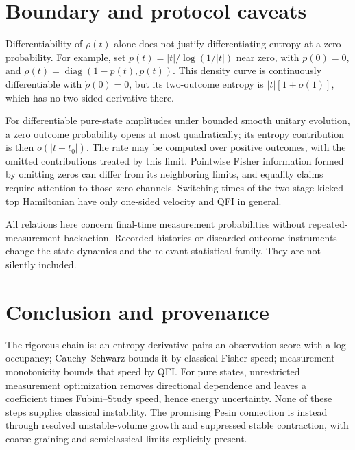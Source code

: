 \documentclass[11pt,a4paper]{article}
\DeclareMathOperator{\diag}{diag}
\begin{document}
\section{Boundary and protocol caveats}
\label{sec:boundary}
Differentiability of $\rho(t)$ alone does not justify differentiating entropy at a zero probability. For example, set $p(t)=|t|/\log(1/|t|)$ near zero, with $p(0)=0$, and $\rho(t)=\diag(1-p(t),p(t))$. This density curve is continuously differentiable with $\dot\rho(0)=0$, but its two-outcome entropy is $|t|[1+o(1)]$, which has no two-sided derivative there.

For differentiable pure-state amplitudes under bounded smooth unitary evolution, a zero outcome probability opens at most quadratically; its entropy contribution is then $o(|t-t_0|)$. The rate may be computed over positive outcomes, with the omitted contributions treated by this limit. Pointwise Fisher information formed by omitting zeros can differ from its neighboring limits, and equality claims require attention to those zero channels. Switching times of the two-stage kicked-top Hamiltonian have only one-sided velocity and QFI in general.

All relations here concern final-time measurement probabilities without repeated-measurement backaction. Recorded histories or discarded-outcome instruments change the state dynamics and the relevant statistical family. They are not silently included.

\section{Conclusion and provenance}
The rigorous chain is: an entropy derivative pairs an observation score with a log occupancy; Cauchy--Schwarz bounds it by classical Fisher speed; measurement monotonicity bounds that speed by QFI. For pure states, unrestricted measurement optimization removes directional dependence and leaves a coefficient times Fubini--Study speed, hence energy uncertainty. None of these steps supplies classical instability. The promising Pesin connection is instead through resolved unstable-volume growth and suppressed stable contraction, with coarse graining and semiclassical limits explicitly present.
\end{document}
